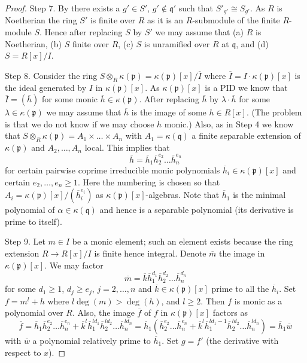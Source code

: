 \begin{proof}
\medskip\noindent
Step 7. By  there exists a $g' \in S'$,
$g' \not \in \mathfrak q'$ such that $S'_{g'} \cong S_{g'}$.
As $R$ is Noetherian the ring $S'$ is finite over $R$ as it is an $R$-submodule
of the finite $R$-module $S$. Hence after replacing $S$ by $S'$ we may
assume that (a) $R$ is Noetherian, (b) $S$ finite over $R$, (c)
$S$ is unramified over $R$ at $\mathfrak q$, and (d) $S = R[x]/I$.

\medskip\noindent
Step 8. Consider the ring
$S \otimes_R \kappa(\mathfrak p) = \kappa(\mathfrak p)[x]/\overline{I}$
where $\overline{I} = I \cdot \kappa(\mathfrak p)[x]$ is the ideal generated
by $I$ in $\kappa(\mathfrak p)[x]$. As $\kappa(\mathfrak p)[x]$ is a PID
we know that $\overline{I} = (\overline{h})$ for some monic
$\overline{h} \in \kappa(\mathfrak p)$. After replacing $\overline{h}$
by $\lambda \cdot \overline{h}$ for some $\lambda \in \kappa(\mathfrak p)$
we may assume that $\overline{h}$ is the image of some $h \in R[x]$.
(The problem is that we do not know if we may choose $h$ monic.)
Also, as in Step 4 we know that
$S \otimes_R \kappa(\mathfrak p) = A_1 \times \ldots \times A_n$ with
$A_1 = \kappa(\mathfrak q)$ a finite separable extension of
$\kappa(\mathfrak p)$ and $A_2, \ldots, A_n$ local. This implies
that
$$
\overline{h} = \overline{h}_1 \overline{h}_2^{e_2} \ldots \overline{h}_n^{e_n}
$$
for certain pairwise coprime irreducible monic polynomials
$\overline{h}_i \in \kappa(\mathfrak p)[x]$ and certain
$e_2, \ldots, e_n \geq 1$. Here the numbering is chosen so that
$A_i = \kappa(\mathfrak p)[x]/(\overline{h}_i^{e_i})$ as
$\kappa(\mathfrak p)[x]$-algebras. Note that $\overline{h}_1$ is
the minimal polynomial of $\alpha \in \kappa(\mathfrak q)$ and hence
is a separable polynomial (its derivative is prime to itself).

\medskip\noindent
Step 9. Let $m \in I$ be a monic element; such an element exists
because the ring extension $R \to R[x]/I$ is finite hence integral.
Denote $\overline{m}$ the image in $\kappa(\mathfrak p)[x]$.
We may factor
$$
\overline{m} = \overline{k}
\overline{h}_1^{d_1} \overline{h}_2^{d_2} \ldots \overline{h}_n^{d_n}
$$
for some $d_1 \geq 1$, $d_j \geq e_j$, $j = 2, \ldots, n$ and
$\overline{k} \in \kappa(\mathfrak p)[x]$ prime to all the $\overline{h}_i$.
Set $f = m^l + h$ where $l \deg(m) > \deg(h)$, and $l \geq 2$.
Then $f$ is monic as a polynomial over $R$. Also, the image $\overline{f}$
of $f$ in $\kappa(\mathfrak p)[x]$ factors as
$$
\overline{f} =
\overline{h}_1 \overline{h}_2^{e_2} \ldots \overline{h}_n^{e_n}
+
\overline{k}^l \overline{h}_1^{ld_1} \overline{h}_2^{ld_2}
\ldots \overline{h}_n^{ld_n}
=
\overline{h}_1(\overline{h}_2^{e_2} \ldots \overline{h}_n^{e_n}
+
\overline{k}^l
\overline{h}_1^{ld_1 - 1} \overline{h}_2^{ld_2} \ldots \overline{h}_n^{ld_n})
= \overline{h}_1 \overline{w}
$$
with $\overline{w}$ a polynomial relatively prime to $\overline{h}_1$.
Set $g = f'$ (the derivative with respect to $x$).


\end{proof}
